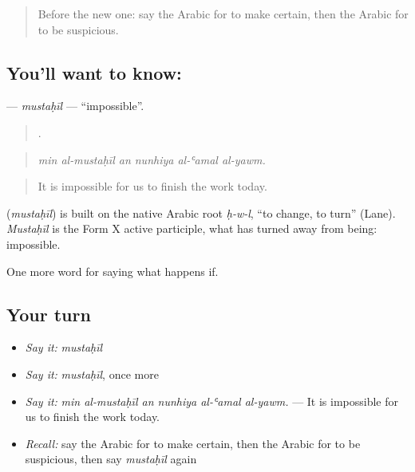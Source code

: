 \label{lesson:AR-C403-mustahil}



\begin{quote}
Before the new one: say the Arabic for to make certain, then the Arabic for to be suspicious.
\end{quote}

\subsection*{You'll want to know: }
\textbf{} — \emph{mustaḥīl} — \textquotedblleft{}impossible\textquotedblright{}.

\begin{quote}
     .
\end{quote}

\begin{quote}
\emph{min al-mustaḥīl an nunhiya al-ʿamal al-yawm.}
\end{quote}

\begin{quote}
It is impossible for us to finish the work today.
\end{quote}

\begin{cousinweb}
\textbf{} (\emph{mustaḥīl}) is built on the native Arabic root \emph{ḥ-w-l}, \textquotedblleft{}to change, to turn\textquotedblright{} (Lane). \emph{Mustaḥīl} is the Form X active participle, what has turned away from being: impossible.
\end{cousinweb}

\begin{grammarlens}[title={What you've built}]
One more word for saying what happens if.
\end{grammarlens}

\subsection*{Your turn}
\begin{itemize}
\raggedright
  \item \emph{Say it:} \emph{mustaḥīl}
  \item \emph{Say it:} \emph{mustaḥīl}, once more
  \item \emph{Say it:} \emph{min al-mustaḥīl an nunhiya al-ʿamal al-yawm.} — It is impossible for us to finish the work today.
  \item \emph{Recall:} say the Arabic for to make certain, then the Arabic for to be suspicious, then say \emph{mustaḥīl} again
\end{itemize}

